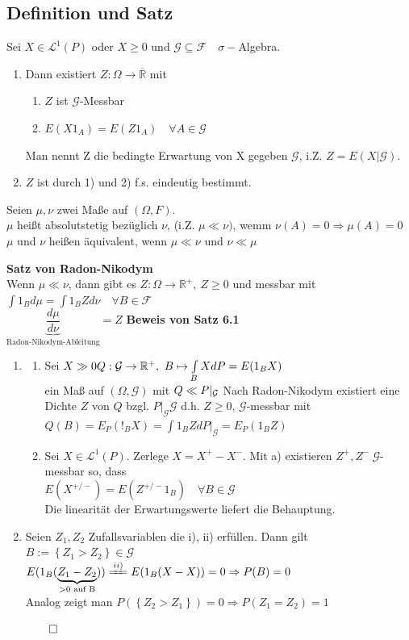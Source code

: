 \documentclass[german,10pt,oneside, fleqn, a4paper]{article}
\newcommand {\R}	{\mathbb{R}}
\newcommand{\Ra}	{\Rightarrow}
\newcommand{\ra}{\rightarrow}
\newcommand{\brac}[1]{\left\lbrace #1\right\rbrace}
\newcommand{\QED}{\begin{flushright}$\qed$\end{flushright}}
\newcommand{\mc}[1]{\mathcal{#1}}
\newcommand{\lp}[1]{\mc{L}^{#1}}
\newcommand{\1}[1]{1_{#1}}
\newcommand{\2}[1]{\1{\brac{#1}}}
\newcommand{\g}{\mc{G}}
\newcommand{\f}{\mc{F}}
\begin{document}
\subsection{Definition und Satz}
\label{6.1}
Sei $X\in\lp{1}(P)$ oder $X\geq0$ und $\g\subseteq\f\quad\sigma-$Algebra.\begin{enumerate}[label=(\alph*)]
\item Dann existiert $Z:\Omega\ra\overline{\R}$ mit \begin{enumerate}[label=(\roman*)]
\item $Z$ ist $\g$-Messbar
\item $E(X1_A)=E(Z1_A)\quad\forall A\in\g$
\end{enumerate}
Man nennt Z die bedingte Erwartung von X gegeben $\g$, i.Z. $Z=E(X|\g)$.
\item $Z$ ist durch 1) und 2) f.s. eindeutig bestimmt.
\end{enumerate}
Seien $\mu,\nu$ zwei Maße auf $(\Omega,F)$.\\
$\mu$ heißt absolutstetig bezüglich $\nu$, (i.Z. $\mu\ll\nu)$, wemm $\nu(A)=0\Ra\mu(A)=0$\\
$\mu$ und $\nu$ heißen äquivalent, wenn $\mu\ll\nu$ und $\nu\ll\mu$

\textbf{Satz von Radon-Nikodym}\\
\label{Radon}
Wenn $\mu\ll\nu$, dann gibt es $Z:\Omega\ra\R^+,\ Z\geq0$ und messbar mit $\int1_Bd\mu=\int1_BZd\nu\quad\forall B\in\f$\\
\grqq$\underbrace{\dfrac{d\mu}{d\nu}}_{\text{Radon-Nikodym-Ableitung}}$\grqq$=Z$
\textbf{Beweis von Satz 6.1}
\begin{enumerate}[label=(\alph*)]
\item \begin{enumerate}[label=(\roman*)]
\item Sei $X\gg0\\
Q:\g\ra\R^+,\ B\mapsto\int\limits_BXdP=E(1_BX)$\\
ein Maß auf $(\Omega,\g)$ mit $Q\ll P|_{\g}\\ $
Nach Radon-Nikodym existiert eine Dichte $Z$ von $Q$ bzgl. $P|_{\g} \g$ d.h. $Z\geq 0$, $\g$-messbar mit \\
$Q(B)=E_P(!_BX)=\int 1_BZdP|_{\g}=E_P(1_BZ)$
\item Sei $X\in\lp{1}(P)$. Zerlege $X=X^+-X^-$. Mit a) existieren $Z^+,Z^-\ \g$-messbar so, dass\\
$E(X^{+/-})=E(Z^{+/-}1_B)\quad\forall B\in\g$\\
Die linearität der Erwartungswerte liefert die Behauptung.
\end{enumerate}
\item Seien $Z_1,Z_2$ Zufallsvariablen die i), ii) erfüllen. Dann gilt\\
$B:=\brac{Z_1>Z_2}\in\g$\\
$E(1_B(\underbrace{Z_1-Z_2}_{>0\text{ auf B}}))\xlongequal{ii)}E(1_B(X-X))=0\\
\Ra P(B)=0$\\
Analog zeigt man $P(\brac{Z_2>Z_1})=0\Ra P(Z_1=Z_2)=1$\QED
\end{enumerate}
\end{document}
